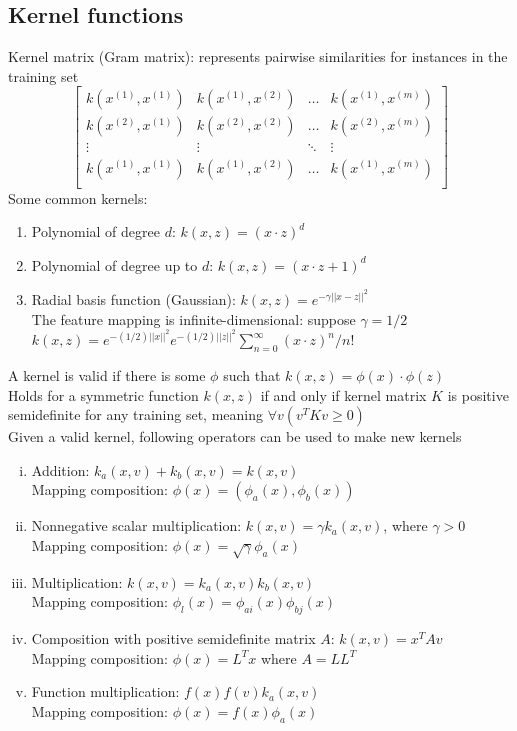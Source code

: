 \documentclass{article}
\begin{document}
		\subsection{Kernel functions}
			Kernel matrix (Gram matrix): represents pairwise similarities for instances in the training set
			\begin{equation*}
				\begin{bmatrix}
					k(x^{(1)}, x^{(1)}) & k(x^{(1)}, x^{(2)}) & \ldots & k(x^{(1)}, x^{(m)}) \\
					k(x^{(2)}, x^{(1)}) & k(x^{(2)}, x^{(2)}) & \ldots & k(x^{(2)}, x^{(m)}) \\
					\vdots & \vdots & \ddots & \vdots \\
					k(x^{(1)}, x^{(1)}) & k(x^{(1)}, x^{(2)}) & \ldots & k(x^{(1)}, x^{(m)}) \\
					\end{bmatrix}
				\end{equation*}
			Some common kernels: 
			\begin{enumerate}
				\item Polynomial of degree $d$: $k(x, z) = (x \cdot z)^d$
				\item Polynomial of degree up to $d$: $k(x, z) = (x \cdot z + 1)^d$
				\item Radial basis function (Gaussian): $k(x, z) = e^{-\gamma||x - z||^2}$ \\
				The feature mapping is infinite-dimensional: suppose $\gamma = 1/2$ \\
				$k(x, z) = e^{-(1/2)||x||^2}e^{-(1/2)||z||^2}\sum_{n = 0}^\infty (x \cdot z)^n/n!$
				\end{enumerate}
			A kernel is valid if there is some $\phi$ such that $k(x, z) = \phi(x) \cdot \phi(z)$ \\
			Holds for a symmetric function $k(x, z)$ if and only if kernel matrix $K$ is positive semidefinite for any training set, meaning $\forall{v}(v^TKv \geq 0)$ \\
			Given a valid kernel, following operators can be used to make new kernels
			\begin{enumerate}[(i)]
				\item Addition: $k_a(x, v) + k_b(x, v) = k(x, v)$ \\
				Mapping composition: $\phi(x) = (\phi_a(x), \phi_b(x))$
				\item Nonnegative scalar multiplication: $k(x, v) = \gamma k_a(x, v)$, where $\gamma > 0$ \\
				Mapping composition: $\phi(x) = \sqrt{\gamma}\phi_a(x)$
				\item Multiplication: $k(x, v) = k_a(x, v)k_b(x, v)$ \\
				Mapping composition: $\phi_l(x) = \phi_{ai}(x)\phi_{bj}(x)$
				\item Composition with positive semidefinite matrix $A$: $k(x, v) = x^TAv$ \\
				Mapping composition: $\phi(x) = L^Tx$ where $A = LL^T$
				\item Function multiplication: $f(x)f(v)k_a(x, v)$ \\
				Mapping composition: $\phi(x) = f(x)\phi_a(x)$
				\end{enumerate}
\end{document}
